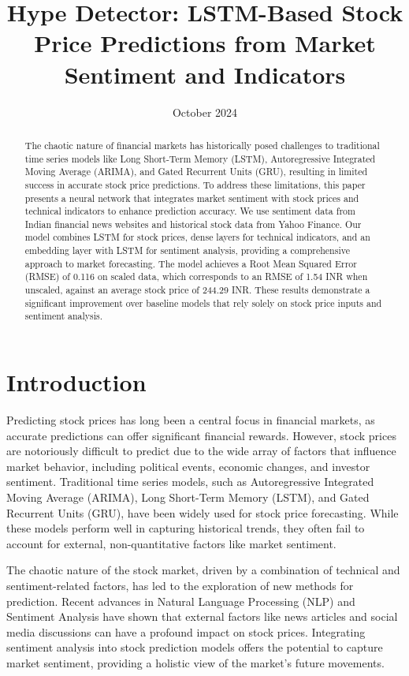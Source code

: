 \documentclass[conference]{IEEEtran}
\title{Hype Detector: LSTM-Based Stock Price Predictions from Market Sentiment and Indicators}
\author{
    \IEEEauthorblockN{Abhinav Srivatsa, Ronith Naguri, Samiksha Racha}
    \IEEEauthorblockA{School of Computer Science and Engineering,\\
    Vellore Institute of Technology, Vellore, Tamil Nadu, India}
}
\date{October 2024} %
\begin{document}
\maketitle

\begin{abstract}
The chaotic nature of financial markets has historically posed challenges to traditional time series models like Long Short-Term Memory (LSTM), Autoregressive Integrated Moving Average (ARIMA), and Gated Recurrent Units (GRU), resulting in limited success in accurate stock price predictions. To address these limitations, this paper presents a neural network that integrates market sentiment with stock prices and technical indicators to enhance prediction accuracy. We use sentiment data from Indian financial news websites and historical stock data from Yahoo Finance. Our model combines LSTM for stock prices, dense layers for technical indicators, and an embedding layer with LSTM for sentiment analysis, providing a comprehensive approach to market forecasting. The model achieves a Root Mean Squared Error (RMSE) of 0.116 on scaled data, which corresponds to an RMSE of 1.54 INR when unscaled, against an average stock price of 244.29 INR. These results demonstrate a significant improvement over baseline models that rely solely on stock price inputs and sentiment analysis.
\end{abstract}

\section{Introduction}
Predicting stock prices has long been a central focus in financial markets, as accurate predictions can offer significant financial rewards. However, stock prices are notoriously difficult to predict due to the wide array of factors that influence market behavior, including political events, economic changes, and investor sentiment. Traditional time series models, such as Autoregressive Integrated Moving Average (ARIMA), Long Short-Term Memory (LSTM), and Gated Recurrent Units (GRU), have been widely used for stock price forecasting. While these models perform well in capturing historical trends, they often fail to account for external, non-quantitative factors like market sentiment.

The chaotic nature of the stock market, driven by a combination of technical and sentiment-related factors, has led to the exploration of new methods for prediction. Recent advances in Natural Language Processing (NLP) and Sentiment Analysis have shown that external factors like news articles and social media discussions can have a profound impact on stock prices. Integrating sentiment analysis into stock prediction models offers the potential to capture market sentiment, providing a holistic view of the market's future movements.
\end{document}
